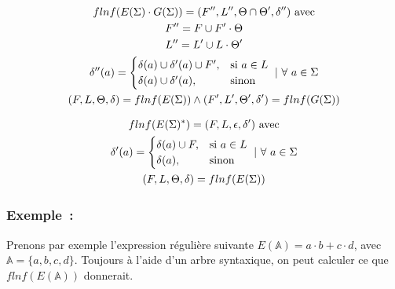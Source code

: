\documentclass[12pt]{article}
\begin{document}
\begin{gather}
    flnf(E(\Sigma) \cdot G(\Sigma)) = (F'', L'', \Theta \cap \Theta', \delta'')~ \text{avec} \\
    F'' = F \cup F' \cdot \Theta \notag \\
    L'' = L' \cup L \cdot \Theta' \notag \\
    \delta''(a) = \begin{cases} \delta(a) \cup \delta'(a) \cup F', & \text{si}~ a \in L \\ \delta(a) \cup \delta'(a), & \text{sinon}\end{cases} ~|~ \forall~a \in \Sigma\notag \\
    (F, L, \Theta, \delta) = flnf(E(\Sigma)) \land (F', L', \Theta', \delta') = flnf(G(\Sigma)) \notag
\end{gather}

\begin{gather}
    flnf(E(\Sigma)^*) = (F, L, \epsilon, \delta')~ \text{avec} \\
    \delta'(a) = \begin{cases} \delta(a) \cup F, & \text{si}~ a \in L \\ \delta(a), & \text{sinon}\end{cases} ~|~ \forall~a \in \Sigma\notag \\
    (F, L, \Theta, \delta) = flnf(E(\Sigma)) \notag
\end{gather}

\subsubsection*{Exemple~:}

Prenons par exemple l'expression régulière suivante \(E(\mathbb{A}) = a \cdot b
+ c \cdot d\), avec \(\mathbb{A} = \{a, b, c, d\}\). Toujours à l'aide d'un
arbre syntaxique, on peut calculer ce que \(flnf(E(\mathbb{A}))\) donnerait.
\end{document}
